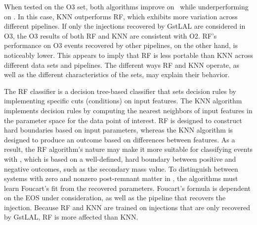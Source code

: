 When tested on the \ac{O3} set, both algorithms improve on \hasns\ while underperforming on
\hasrem.  In this case, \ac{KNN} outperforms \ac{RF}, which exhibits more variation across different pipelines.  If only the injections recovered by GstLAL are considered in \ac{O3}, the
\ac{O3} results of both \ac{RF} and \ac{KNN} are consistent with \ac{O2}. \ac{RF}'s performance on \ac{O3} events recovered by other pipelines, on the other hand, is noticeably lower.
This appears to imply that \ac{RF} is less portable than \ac{KNN} across different data sets and pipelines. The different ways \ac{RF} and \ac{KNN} operate, as well as the different
characteristics of the sets, may explain their behavior.

The RF classifier is a decision tree-based classifier that sets decision rules by implementing specific cuts (conditions) on input features. The \ac{KNN} algorithm implements decision
rules by computing the nearest neighbors of input features in the parameter space for the data point of interest. \ac{RF} is designed to construct hard boundaries based on input
parameters, whereas the \ac{KNN} algorithm is designed to produce an outcome based on differences between features. As a result, the \ac{RF} algorithm's nature may make it more suitable
for classifying events with \hasns, which is based on a well-defined, hard boundary between positive and negative outcomes, such as the secondary mass value. To distinguish between
systems with zero and nonzero post-remnant matter in \hasrem, the algorithms must learn Foucart's fit from the recovered parameters. Foucart's formula is dependent on the \ac{EOS} under
consideration, as well as the pipeline that recovers the injection. Because \ac{RF} and \ac{KNN} are trained on injections that are only recovered by GstLAL, \ac{RF} is more affected than
\ac{KNN}. 

